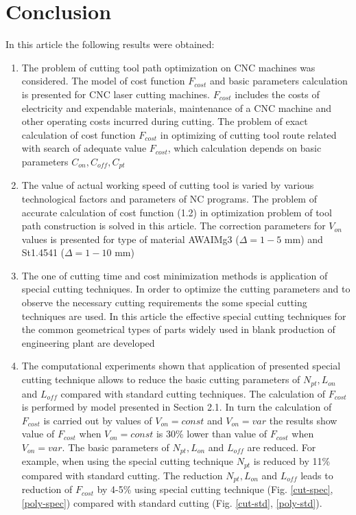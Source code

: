 \documentclass[runningheads]{llncs}
\begin{document}
\section{Conclusion}

In this article the following results were obtained:

\begin{enumerate}

\item  The problem of cutting tool path optimization on CNC machines was considered.
The model of cost function $F_{cost}$ and basic parameters calculation is presented for CNC laser cutting machines.
$F_{cost}$ includes the costs of electricity and expendable materials,
maintenance of a CNC machine and other operating costs incurred during cutting.
The problem of exact calculation of cost function  $F_{cost}$
in optimizing of cutting tool route related with search of adequate value  $F_{cost}$,
which calculation depends on basic parameters $C_{on}, C_{off}, C_{pt}$

\item The value of actual working speed of cutting tool is varied
by various technological factors and parameters of NC programs.
The problem of accurate calculation of cost function (1.2)
in optimization problem of tool path construction is solved in this article.
The correction parameters for $V_{on}$ values
is presented for type of material AWAIMg3 ($\Delta=1-5$ mm) and St1.4541 ($\Delta=1-10$ mm)

\item The one of cutting time and cost minimization methods is application of special cutting techniques.
In order to optimize the cutting parameters and to observe the necessary cutting requirements
the some special cutting techniques are used.
In this article the effective special cutting techniques
for the common geometrical types of parts
widely used in blank production of engineering plant are developed

\item The computational experiments shown that
application of presented special cutting technique allows to
reduce the basic cutting parameters of $N_{pt}, L_{on}$
and $L_{off}$ compared with standard cutting techniques.
The calculation of $F_{cost}$ is performed by model presented in Section 2.1.
In turn the calculation of  $F_{cost}$ is carried out by values of
$V_{on}=const$ and $V_{on}=var$
the results show value of $F_{cost}$ when $V_{on}=const$  is 30\% lower
than value of $F_{cost}$  when $V_{on}=var$.
The basic parameters of $N_{pt}, L_{on}$
and $L_{off}$
are reduced.
For example, when using the special cutting technique
$N_{pt}$ is reduced by 11\%  compared with standard cutting.
The reduction $N_{pt}, L_{on}$
and $L_{off}$
leads to reduction of $F_{cost}$ by 4-5\%
using special cutting technique (Fig. \ref{cut-spec}, \ref{poly-spec})
compared with standard cutting (Fig. \ref{cut-std}, \ref{poly-std}).

\end{enumerate}



\nocite{*}
\end{document}
